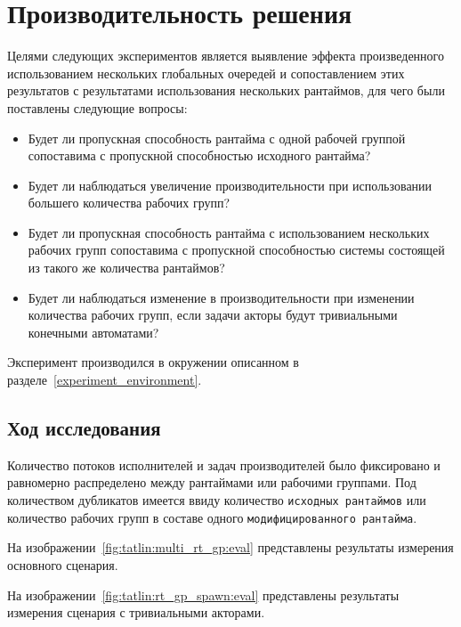 \section{Производительность решения}

Целями следующих экспериментов является выявление эффекта произведенного использованием нескольких глобальных очередей и сопоставлением этих результатов с результатами использования нескольких рантаймов, для чего были поставлены следующие вопросы:

\begin{itemize}\label{quest}
    \item Будет ли пропускная способность рантайма с одной рабочей группой сопоставима с пропускной способностью исходного рантайма?
    \item Будет ли наблюдаться увеличение производительности при использовании большего количества рабочих групп?
    \item Будет ли пропускная способность рантайма с использованием нескольких рабочих групп сопоставима с пропускной способностью системы состоящей из такого же количества рантаймов?
    \item Будет ли наблюдаться изменение в производительности при изменении количества рабочих групп, если задачи акторы будут тривиальными конечными автоматами?
\end{itemize}

Эксперимент производился в окружении описанном в разделе~\ref{experiment_environment}.

\subsection{Ход исследования}

Количество потоков исполнителей и задач производителей было фиксировано и равномерно распределено между рантаймами или рабочими группами. Под количеством дубликатов имеется ввиду количество \verb|исходных рантаймов| или количество рабочих групп в составе одного \verb|модифицированного рантайма|.

На изображении~\ref{fig:tatlin:multi_rt_gp:eval} представлены результаты измерения основного сценария.

На изображении~\ref{fig:tatlin:rt_gp_spawn:eval} представлены результаты измерения сценария с тривиальными акторами.


